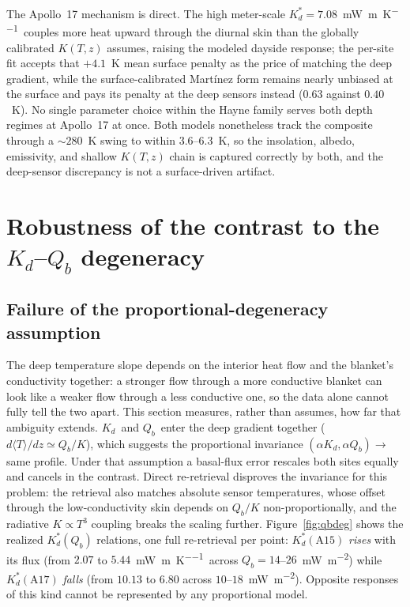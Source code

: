 \documentclass[11pt,a4paper,oneside]{report}
\newcommand{\Kd}{\ensuremath{K_d}}
\newcommand{\Kds}{\ensuremath{K_d^{*}}}
\newcommand{\Qb}{\ensuremath{Q_b}}
\newcommand{\Tm}{\ensuremath{\langle T\rangle}}
\newcommand{\mWmK}{\si{\milli\watt\per\meter\per\kelvin}}
\newcommand{\mWm}{\si{\milli\watt\per\square\meter}}
\begin{document}
The Apollo~17 mechanism is direct. The high meter-scale
$\Kds=7.08$~\mWmK\ couples more heat upward through the diurnal skin
than the globally calibrated $K(T,z)$ assumes, raising the modeled
dayside response; the per-site fit accepts that $+4.1$~K mean surface
penalty as the price of matching the deep gradient, while the
surface-calibrated Mart\'inez form remains nearly unbiased at the
surface and pays its penalty at the deep sensors instead ($0.63$
against $0.40$~K). No single parameter choice within the Hayne family
serves both depth regimes at Apollo~17 at once. Both models
nonetheless track the composite through a ${\sim}280$~K swing to
within $3.6$--$6.3$~K, so the insolation, albedo, emissivity, and
shallow $K(T,z)$ chain is captured correctly by both, and the
deep-sensor discrepancy is not a surface-driven artifact.

\section{Robustness of the contrast to the
  \texorpdfstring{$\Kd$--$\Qb$}{Kd-Qb} degeneracy}\label{sec:robustness}

\subsection{Failure of the proportional-degeneracy assumption}
The deep temperature slope depends on the interior heat flow and the
blanket's conductivity together: a stronger flow through a more
conductive blanket can look like a weaker flow through a less
conductive one, so the data alone cannot fully tell the two apart.
This section measures, rather than assumes, how far that ambiguity
extends. \Kd\ and \Qb\ enter the deep gradient together
($d\Tm/dz\simeq\Qb/K$), which suggests the proportional invariance
$(\alpha\Kd,\alpha\Qb)\to$ same profile. Under that assumption a
basal-flux error rescales both sites equally and cancels in the
contrast. Direct re-retrieval disproves the invariance for this
problem: the retrieval also matches absolute sensor temperatures,
whose offset through the low-conductivity skin depends on $\Qb/K$
non-proportionally, and the radiative $K\propto T^3$ coupling breaks
the scaling further. Figure~\ref{fig:qbdeg} shows the realized
$\Kds(\Qb)$ relations, one full re-retrieval per point:
$\Kds(\mathrm{A15})$ \emph{rises} with its flux (from $2.07$ to
$5.44$~\mWmK\ across $\Qb=14$--$26$~\mWm) while $\Kds(\mathrm{A17})$
\emph{falls} (from $10.13$ to $6.80$ across $10$--$18$~\mWm).
Opposite responses of this kind cannot be represented by any
proportional model.
\end{document}
